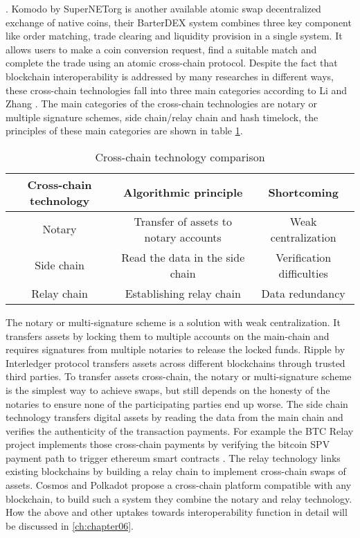 \cite{borkowski2019dextt}. Komodo \cite{barterdex2020} by SuperNETorg is another available atomic swap decentralized exchange of native coins, their BarterDEX system combines three key component like order matching, trade clearing and liquidity provision in a single system. It allows users to make a coin conversion request, find a suitable match and complete the trade using an atomic cross-chain protocol. Despite the fact that blockchain interoperability is addressed by many researches in different ways, these cross-chain technologies fall into three main categories according to Li and Zhang \cite{li2019research}. The main categories of the cross-chain technologies are notary or multiple signature schemes, side chain/relay chain and hash timelock, the principles of these main categories are shown in table \ref{table:1}. \newline

\begin{table}[h!]
	\centering
	\begin{tabular}{|c | c | c |} 
		\hline 
		Cross-chain technology & Algorithmic principle & Shortcoming \\ [0.5ex] 
		\hline \hline
		Notary & Transfer of assets to notary accounts & Weak centralization  \\ 
		\hline
		Side chain & Read the data in the side chain & Verification difficulties  \\
		\hline
		Relay chain & Establishing relay chain & Data redundancy  \\ [1ex] 
		\hline
	\end{tabular}
	\caption{Cross-chain technology comparison}
	\label{table:1}
\end{table}

The notary or multi-signature scheme is a solution with weak centralization. It transfers assets by locking them to multiple accounts on the main-chain and requires signatures from multiple notaries to release the locked funds. Ripple by Interledger protocol \cite{hope2016interledger} transfers assets across different blockchains through trusted third parties. To transfer assets cross-chain, the notary or multi-signature scheme is the simplest way to achieve swaps, but still depends on the honesty of the notaries to ensure none of the participating parties end up worse. The side chain technology transfers digital assets by reading the data from the main chain and verifies the authenticity of the transaction payments. For example the BTC Relay \cite{btcrelay} project implements those cross-chain payments by verifying the bitcoin \ac{SPV} payment path to trigger ethereum smart contracts \cite{buterin2014ethereum}. The relay technology links existing blockchains by building a relay chain to implement cross-chain swaps of assets. Cosmos \cite{kwon2018network} and Polkadot \cite{wood2016polkadot} propose a cross-chain platform compatible with any blockchain, to build such a system they combine the notary and relay technology. How the above and other uptakes towards interoperability function in detail will be discussed in \autoref{ch:chapter06}.


